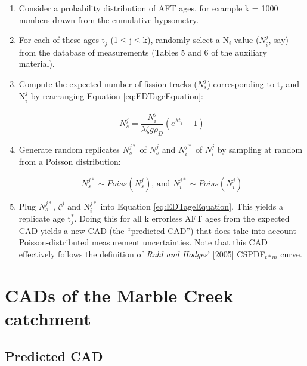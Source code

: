 \documentclass[12pt,twoside]{article}
\begin{document}
\begin{enumerate}
\item  Consider a probability  distribution of  AFT ages,  for example
  k = 1000 numbers drawn from the cumulative hypsometry.
\item For each of  these ages t$_j$ (1$\leq$j$\leq$k), randomly select
  a  N$_i$ value  ($N_i^j$,  say) from  the  database of  measurements
  (Tables 5 and 6 of the auxiliary material).
\item  Compute  the  expected   number  of  fission  tracks  ($N_s^j$)
  corresponding   to  t$_j$  and   N$_i^j$  by   rearranging  Equation
  \ref{eq:EDTageEquation}:

\begin{equation}
  \label{eq:modifiedAgeEquation}
N_s^j = \frac{N_i^j}{\lambda \zeta  g \rho_D} \left( e^{\lambda t_j} - 1 \right)
\end{equation}

\item Generate random replicates  $N_s^{j*}$ of $N_s^j$ and $N_i^{j*}$
of $N_i^j$ by sampling at random from a Poisson distribution:

\begin{equation}
  \label{eq:poisson}
  N_s^{j*} \sim Poiss(N_s^j)\mbox{, and }N_i^{j*} \sim Poiss(N_i^j)
\end{equation}

\item  Plug   $N_s^{j*}$,  $\zeta^j$  and   N$_i^{j*}$  into  Equation
  \ref{eq:EDTageEquation}.  This yields a replicate age t$_j^*$. Doing
  this for all k errorless AFT ages from the expected CAD yields a new
  CAD   (the  ``predicted   CAD'')   that  does   take  into   account
  Poisson-distributed measurement  uncertainties.  Note that  this CAD
  effectively follows the definition  of {\it Ruhl and Hodges}' [2005]
  CSPDF$_{t*m}$ curve.
\end{enumerate}

\section{CADs of the Marble Creek catchment}
\label{sec:application}

\subsection{Predicted CAD}
\label{sec:predictedCAD}
\end{document}
